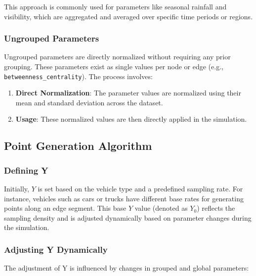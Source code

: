 \documentclass[sigplan,screen]{acmart}
\begin{document}
This approach is commonly used for parameters like seasonal rainfall and visibility, which are aggregated and averaged over specific time periods or regions.

\subsubsection{Ungrouped Parameters}
Ungrouped parameters are directly normalized without requiring any prior grouping. These parameters exist as single values per node or edge (e.g., \texttt{betweenness\_centrality}). The process involves:

\begin{enumerate}
    \item \textbf{Direct Normalization}: The parameter values are normalized using their mean and standard deviation across the dataset.
    \item \textbf{Usage}: These normalized values are then directly applied in the simulation.
\end{enumerate}

\subsection{Point Generation Algorithm}




\subsubsection{Defining Y}
Initially, $Y$ is set based on the vehicle type and a predefined sampling rate. 
For instance, vehicles such as cars or trucks have different base 
rates for generating points along an edge segment. 
This base $Y$ value (denoted as $Y_0$) reflects the sampling density 
and is adjusted dynamically based on parameter 
changes during the simulation.

\subsubsection{Adjusting Y Dynamically}
The adjustment of Y is influenced by changes in grouped and global parameters:
\end{document}
